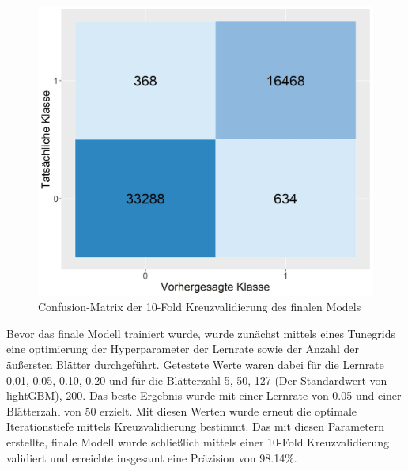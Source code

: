 \begin{figure}[ht]
    \centering
    \includegraphics[scale=0.45]{graphics/confusion_matrix.jpg}
    \caption{Confusion-Matrix der 10-Fold Kreuzvalidierung des finalen Models}
    \label{confusion-table}
\end{figure}


Bevor das finale Modell trainiert wurde, wurde zunächst mittels eines Tunegrids eine optimierung der Hyperparameter der Lernrate sowie der Anzahl der äußersten Blätter durchgeführt.
Getestete Werte waren dabei für die Lernrate 0.01, 0.05, 0.10, 0.20 und für die Blätterzahl 5, 50, 127 (Der Standardwert von lightGBM), 200.
Das beste Ergebnis wurde mit einer Lernrate von 0.05 und einer Blätterzahl von 50 erzielt.
Mit diesen Werten wurde erneut die optimale Iterationstiefe mittels Kreuzvalidierung bestimmt.
Das mit diesen Parametern erstellte, finale Modell wurde schließlich mittels einer 10-Fold Kreuzvalidierung validiert und erreichte insgesamt eine Präzision von 98.14\%.

